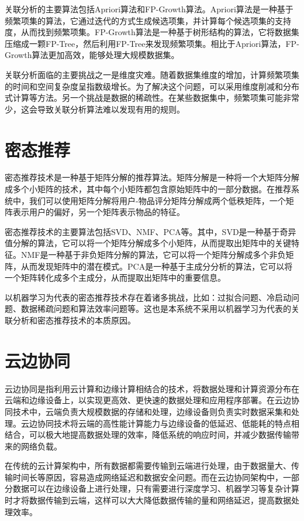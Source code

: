 \documentclass[promaster]{thesis-uestc}
\begin{document}
关联分析的主要算法包括Apriori算法和FP-Growth算法。Apriori算法是一种基于频繁项集的算法，它通过迭代的方式生成候选项集，并计算每个候选项集的支持度，从而找到频繁项集。FP-Growth算法是一种基于树形结构的算法，它将数据集压缩成一颗FP-Tree，然后利用FP-Tree来发现频繁项集。相比于Apriori算法，FP-Growth算法更加高效，能够处理大规模数据集。

关联分析面临的主要挑战之一是维度灾难。随着数据集维度的增加，计算频繁项集的时间和空间复杂度呈指数级增长。为了解决这个问题，可以采用维度削减和分布式计算等方法。另一个挑战是数据的稀疏性。在某些数据集中，频繁项集可能非常少，这会导致关联分析算法难以发现有用的规则。

\section{密态推荐}
密态推荐技术是一种基于矩阵分解的推荐算法。矩阵分解是一种将一个大矩阵分解成多个小矩阵的技术，其中每个小矩阵都包含原始矩阵中的一部分数据。在推荐系统中，我们可以使用矩阵分解将用户-物品评分矩阵分解成两个低秩矩阵，一个矩阵表示用户的偏好，另一个矩阵表示物品的特征。

密态推荐技术的主要算法包括SVD、NMF、PCA等。其中，SVD是一种基于奇异值分解的算法，它可以将一个矩阵分解成多个小矩阵，从而提取出矩阵中的关键特征。NMF是一种基于非负矩阵分解的算法，它可以将一个矩阵分解成多个非负矩阵，从而发现矩阵中的潜在模式。PCA是一种基于主成分分析的算法，它可以将一个矩阵转化成多个主成分，从而提取出矩阵中的重要信息。

以机器学习为代表的密态推荐技术存在着诸多挑战，比如：过拟合问题、冷启动问题、数据稀疏问题和算法效率问题等。这也是本系统不采用以机器学习为代表的关联分析和密态推荐技术的本质原因。

\section{云边协同}
云边协同是指利用云计算和边缘计算相结合的技术，将数据处理和计算资源分布在云端和边缘设备上，以实现更高效、更快速的数据处理和应用程序部署。在云边协同技术中，云端负责大规模数据的存储和处理，边缘设备则负责实时数据采集和处理。云边协同技术将云端的高性能计算能力与边缘设备的低延迟、低能耗的特点相结合，可以极大地提高数据处理的效率，降低系统的响应时间，并减少数据传输带来的网络负载。

在传统的云计算架构中，所有数据都需要传输到云端进行处理，由于数据量大、传输时间长等原因，容易造成网络延迟和数据安全问题。而在云边协同架构中，一部分数据可以在边缘设备上进行处理，只有需要进行深度学习、机器学习等复杂计算时才将数据传输到云端，这样可以大大降低数据传输的量和网络延迟，提高数据处理效率。
\end{document}
